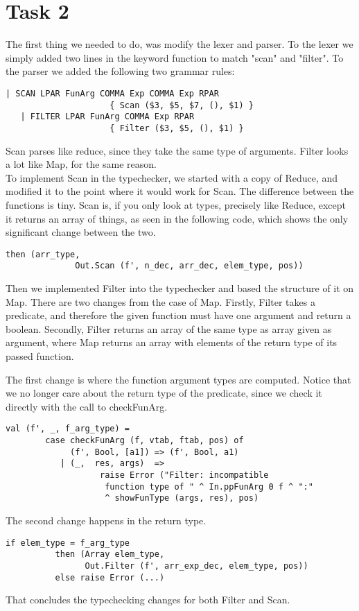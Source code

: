 \documentclass[10pt]{article}
\begin{document}
\section{Task 2}
The first thing we needed to do, was modify the lexer and parser. To the lexer we simply added two lines in the keyword function to match "scan" and "filter".
To the parser we added the following two grammar rules:
\begin{Verbatim}[frame=single]
   | SCAN LPAR FunArg COMMA Exp COMMA Exp RPAR
                     { Scan ($3, $5, $7, (), $1) }
   | FILTER LPAR FunArg COMMA Exp RPAR
                     { Filter ($3, $5, (), $1) }
\end{Verbatim}
Scan parses like reduce, since they take the same type of arguments. Filter looks a lot like Map, for the same reason.\\

To implement Scan in the typechecker, we started with a copy of Reduce, and modified it to the point where it would work for Scan. The difference between the functions is tiny. Scan is, if you only look at types, precisely like Reduce, except it returns an array of things, as seen in the following code, which shows the only significant change between the two.

\begin{Verbatim}[frame=single]
    then (arr_type,
    	      Out.Scan (f', n_dec, arr_dec, elem_type, pos))
\end{Verbatim}


Then we implemented Filter into the typechecker and based the structure of it on Map. There are two changes from the case of Map. Firstly, Filter takes a predicate, and therefore the given function must have one argument and return a boolean. Secondly, Filter returns an array of the same type as array given as argument, where Map returns an array with elements of the return type of its passed function.

The first change is where the function argument types are computed. Notice that we no longer care about the return type of the predicate, since we check it directly with the call to checkFunArg. 
\begin{Verbatim}[frame=single]
	val (f', _, f_arg_type) =
        case checkFunArg (f, vtab, ftab, pos) of
             (f', Bool, [a1]) => (f', Bool, a1)
           | (_,  res, args)  =>
                   raise Error ("Filter: incompatible
                    function type of " ^ In.ppFunArg 0 f ^ ":" 
                    ^ showFunType (args, res), pos)

\end{Verbatim}
The second change happens in the return type.
\begin{Verbatim}[frame=single]
	if elem_type = f_arg_type
          then (Array elem_type,
                Out.Filter (f', arr_exp_dec, elem_type, pos))
          else raise Error (...)
\end{Verbatim}
That concludes the typechecking changes for both Filter and Scan.\\
\end{document}
